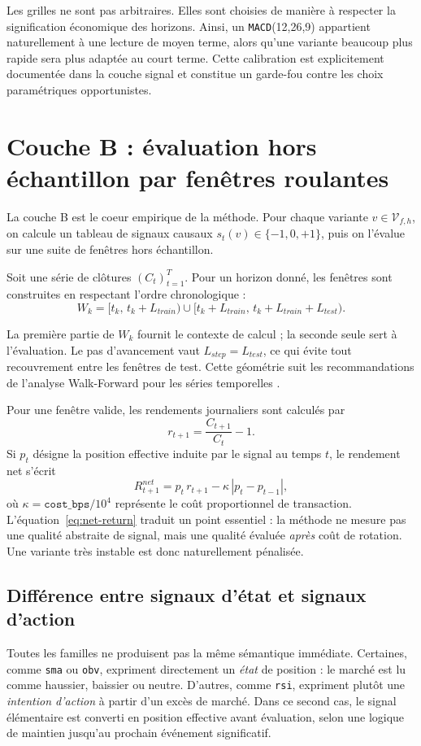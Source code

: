 Les grilles ne sont pas arbitraires. Elles sont choisies de manière à respecter
la signification économique des horizons. Ainsi, un \texttt{MACD}(12,26,9)
appartient naturellement à une lecture de moyen terme, alors qu'une variante
beaucoup plus rapide sera plus adaptée au court terme. Cette calibration est
explicitement documentée dans la couche signal et constitue un garde-fou contre
les choix paramétriques opportunistes.

\section{Couche B : évaluation hors échantillon par fenêtres roulantes}
La couche B est le coeur empirique de la méthode. Pour chaque variante
\(v \in \mathcal{V}_{f,h}\), on calcule un tableau de signaux causaux
\(s_t(v) \in \{-1,0,+1\}\), puis on l'évalue sur une suite de fenêtres
hors échantillon.

Soit une série de clôtures \((C_t)_{t=1}^{T}\). Pour un horizon donné, les
fenêtres sont construites en respectant l'ordre chronologique :
\[
W_k = [t_k,\, t_k+L_{train}) \cup [t_k+L_{train},\, t_k+L_{train}+L_{test}).
\]

La première partie de \(W_k\) fournit le contexte de calcul ; la seconde seule
sert à l'évaluation. Le pas d'avancement vaut \(L_{step}=L_{test}\), ce qui
évite tout recouvrement entre les fenêtres de test. Cette géométrie suit les
recommandations de l'analyse Walk-Forward pour les séries temporelles
\cite{pardo2008,tashman2000}.

Pour une fenêtre valide, les rendements journaliers sont calculés par
\[
r_{t+1}=\frac{C_{t+1}}{C_t}-1.
\]
Si \(p_t\) désigne la position effective induite par le signal au temps \(t\),
le rendement net s'écrit
\begin{equation}
R^{net}_{t+1} = p_t\,r_{t+1} - \kappa\,|p_t-p_{t-1}|,
\label{eq:net-return}
\end{equation}
où \(\kappa=\texttt{cost\_bps}/10^4\) représente le coût proportionnel de
transaction. L'équation~\ref{eq:net-return} traduit un point essentiel : la
méthode ne mesure pas une qualité abstraite de signal, mais une qualité
évaluée \emph{après} coût de rotation. Une variante très instable est donc
naturellement pénalisée.

\subsection{Différence entre signaux d'état et signaux d'action}
Toutes les familles ne produisent pas la même sémantique immédiate. Certaines,
comme \texttt{sma} ou \texttt{obv}, expriment directement un \emph{état} de
position : le marché est lu comme haussier, baissier ou neutre. D'autres, comme
\texttt{rsi}, expriment plutôt une \emph{intention d'action} à partir d'un excès
de marché. Dans ce second cas, le signal élémentaire est converti en position
effective avant évaluation, selon une logique de maintien jusqu'au prochain
événement significatif.

